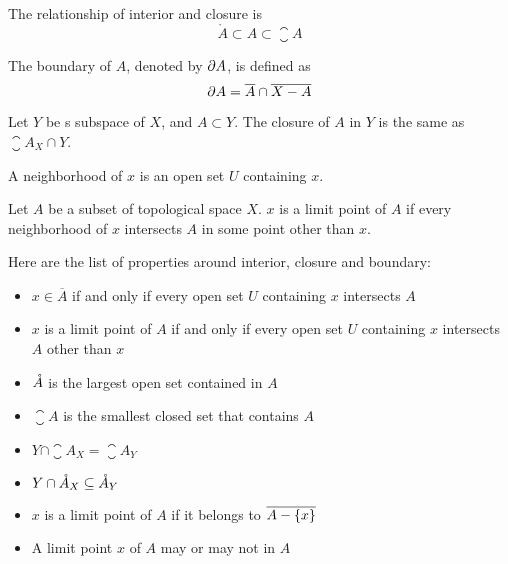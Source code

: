\begin{theorem}
    The relationship of interior and closure is
\begin{equation}
    \mathring{A} \subset A \subset \closure{A}
\end{equation}
\end{theorem}



\begin{definition}
    The boundary of $A$, denoted by $\partial A$, is defined as
    \begin{equation}
        \partial A = \overline{A} \cap \overline{X - A}
    \end{equation}
\end{definition}

\begin{theorem}
    Let $Y$ be s subspace of $X$, and $A \subset Y$. The closure of $A$ in $Y$ is the same as $\closure{A}_X \cap Y$.
\end{theorem}


\begin{definition}
    A neighborhood of $x$ is an open set $U$ containing $x$.
\end{definition}


\begin{definition}
    Let $A$ be a subset of topological space $X$. $x$ is a limit point of $A$ if every neighborhood of $x$ intersects $A$ in some point other than $x$.
\end{definition}



\begin{theorem}
    Here are the list of properties around interior, closure and boundary:
    \begin{itemize}
        \item $x \in \overline{A}$ if and only if every open set $U$ containing $x$ intersects $A$
        \item $x$ is a limit point of $A$ if and only if every open set $U$ containing $x$ intersects $A$ other than $x$
        \item $\mathring{A}$ is the largest open set contained in $A$
        \item $\closure{A}$ is the smallest closed set that contains $A$
        \item $Y \cap \closure{A}_X = \closure{A}_Y$
        \item $Y \cap \mathring{A}_X \subseteq \mathring{A}_Y$
        \item $x$ is a limit point of $A$ if it belongs to $\overline{A - \set{x}}$
        \item A limit point $x$ of $A$ may or may not in $A$
    \end{itemize}
\end{theorem}





